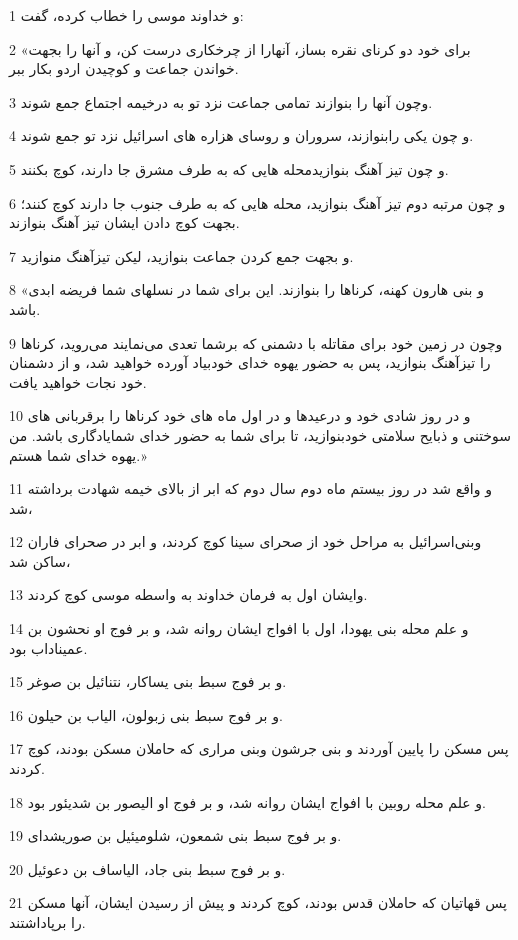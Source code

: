 \par 1 و خداوند موسی را خطاب کرده، گفت:
\par 2 «برای خود دو کرنای نقره بساز، آنهارا از چرخکاری درست کن، و آنها را بجهت خواندن جماعت و کوچیدن اردو بکار ببر.
\par 3 وچون آنها را بنوازند تمامی جماعت نزد تو به درخیمه اجتماع جمع شوند.
\par 4 و چون یکی رابنوازند، سروران و روسای هزاره های اسرائیل نزد تو جمع شوند. 
\par 5 و چون تیز آهنگ بنوازیدمحله هایی که به طرف مشرق جا دارند، کوچ بکنند.
\par 6 و چون مرتبه دوم تیز آهنگ بنوازید، محله هایی که به طرف جنوب جا دارند کوچ کنند؛ بجهت کوچ دادن ایشان تیز آهنگ بنوازند.
\par 7 و بجهت جمع کردن جماعت بنوازید، لیکن تیزآهنگ منوازید.
\par 8 «و بنی هارون کهنه، کرناها را بنوازند. این برای شما در نسلهای شما فریضه ابدی باشد.
\par 9 وچون در زمین خود برای مقاتله با دشمنی که برشما تعدی می‌نمایند می‌روید، کرناها را تیزآهنگ بنوازید، پس به حضور یهوه خدای خودبیاد آورده خواهید شد، و از دشمنان خود نجات خواهید یافت.
\par 10 و در روز شادی خود و درعیدها و در اول ماه های خود کرناها را برقربانی های سوختنی و ذبایح سلامتی خودبنوازید، تا برای شما به حضور خدای شمایادگاری باشد. من یهوه خدای شما هستم.»
\par 11 و واقع شد در روز بیستم ماه دوم سال دوم که ابر از بالای خیمه شهادت برداشته شد،
\par 12 وبنی‌اسرائیل به مراحل خود از صحرای سینا کوچ کردند، و ابر در صحرای فاران ساکن شد،
\par 13 وایشان اول به فرمان خداوند به واسطه موسی کوچ کردند.
\par 14 و علم محله بنی یهودا، اول با افواج ایشان روانه شد، و بر فوج او نحشون بن عمیناداب بود.
\par 15 و بر فوج سبط بنی یساکار، نتنائیل بن صوغر.
\par 16 و بر فوج سبط بنی زبولون، الیاب بن حیلون.
\par 17 پس مسکن را پایین آوردند و بنی جرشون وبنی مراری که حاملان مسکن بودند، کوچ کردند.
\par 18 و علم محله روبین با افواج ایشان روانه شد، و بر فوج او الیصور بن شدیئور بود.
\par 19 و بر فوج سبط بنی شمعون، شلومیئیل بن صوریشدای.
\par 20 و بر فوج سبط بنی جاد، الیاساف بن دعوئیل.
\par 21 پس قهاتیان که حاملان قدس بودند، کوچ کردند و پیش از رسیدن ایشان، آنها مسکن را برپاداشتند.
